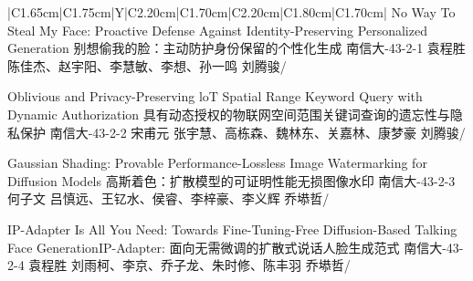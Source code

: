 \Needspace{7.5cm}
\begin{tabularx}{\textwidth}{|C{1.65cm}|C{1.75cm}|Y|C{2.20cm}|C{1.70cm}|C{2.20cm}|C{1.80cm}|C{1.70cm}|}
\HeaderRow
{}
{No Way To Steal My Face: Proactive Defense Against Identity-Preserving Personalized Generation \newline 别想偷我的脸：主动防护身份保留的个性化生成}
{南信大-43-2-1}
{袁程胜}
{陈佳杰、赵宇阳、李慧敏、李想、孙一鸣}
{刘腾骏}{/}

{Oblivious and Privacy-Preserving loT Spatial Range Keyword Query with Dynamic Authorization  \newline 具有动态授权的物联网空间范围关键词查询的遗忘性与隐私保护}
{南信大-43-2-2}
{宋甫元}
{张宇慧、高栋森、魏林东、关嘉林、康梦豪}
{刘腾骏}{/}


{Gaussian Shading: Provable Performance-Lossless Image Watermarking for Diffusion Models
\newline 高斯着色：扩散模型的可证明性能无损图像水印}
{南信大-43-2-3}
{何子文}
{吕慎远、王钇水、侯睿、李梓豪、李义辉}
{乔塨哲}{/}

{IP-Adapter Is All You Need: Towards Fine-Tuning-Free Diffusion-Based Talking Face Generation\newline IP-Adapter: 面向无需微调的扩散式说话人脸生成范式 }
{南信大-43-2-4}
{袁程胜}
{刘雨柯、李京、乔子龙、朱时修、陈丰羽}
{乔塨哲}{/}
\end{tabularx}
\BlockGap


